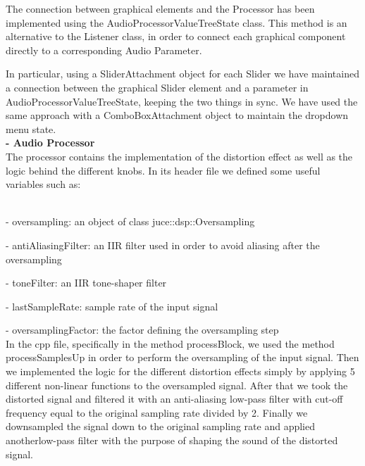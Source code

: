 \documentclass[letterpaper, 12pt]{article}
\begin{document}
	The connection between graphical elements and the Processor has been implemented using the AudioProcessorValueTreeState class. This method is an alternative to the Listener class, in order to connect each graphical component directly to a corresponding Audio Parameter.
	
	In particular, using  a SliderAttachment object for each Slider we have maintained a connection between the graphical Slider element and a parameter in AudioProcessorValueTreeState, keeping the two things in sync. We have used the same approach with a ComboBoxAttachment object to maintain the dropdown menu state.
	\\
	
	\textbf{-	Audio Processor 
}\\

        The processor contains the implementation of the distortion effect as well as the logic behind the different knobs.
        In its header file we defined some useful variables such as:
        
        \\
	-	oversampling: an object of class juce::dsp::Oversampling
	
	-	antiAliasingFilter: an IIR filter used in order to avoid aliasing after the oversampling
	
	-	toneFilter: an IIR tone-shaper filter
	
	-	lastSampleRate: sample rate of the input signal

	-	oversamplingFactor: the factor defining the oversampling step
        \\

        In the cpp file, specifically in the method processBlock, we used the method processSamplesUp in order to perform the oversampling of the input signal.
        Then we implemented the logic for the different distortion effects simply by applying 5 different non-linear functions to the oversampled signal.
        After that we took the distorted signal and filtered it with an anti-aliasing low-pass filter with cut-off frequency equal to the original sampling rate divided by 2.
        Finally we downsampled the signal down to the original sampling rate and applied anotherlow-pass filter with the purpose of shaping the sound of the distorted signal.  
	
	\begin{thebibliography}{99}
		
	\end{thebibliography}
	
	
\end{document}
